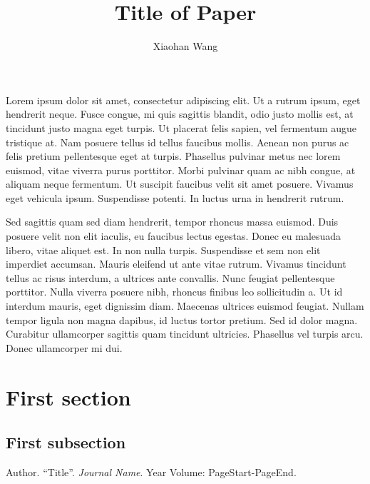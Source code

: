 \documentclass[10pt]{article}
\begin{document}
\title{Title of Paper}
\author{\small{Xiaohan Wang}}\date{}
\maketitle

Lorem ipsum dolor sit amet, consectetur adipiscing elit. Ut a rutrum ipsum, eget hendrerit neque. Fusce congue, mi quis sagittis blandit, odio justo mollis est, at tincidunt justo magna eget turpis. Ut placerat felis sapien, vel fermentum augue tristique at. Nam posuere tellus id tellus faucibus mollis. Aenean non purus ac felis pretium pellentesque eget at turpis. Phasellus pulvinar metus nec lorem euismod, vitae viverra purus porttitor. Morbi pulvinar quam ac nibh congue, at aliquam neque fermentum. Ut suscipit faucibus velit sit amet posuere. Vivamus eget vehicula ipsum. Suspendisse potenti. In luctus urna in hendrerit rutrum. \smallskip

Sed sagittis quam sed diam hendrerit, tempor rhoncus massa euismod. Duis posuere velit non elit iaculis, eu faucibus lectus egestas. Donec eu malesuada libero, vitae aliquet est. In non nulla turpis. Suspendisse et sem non elit imperdiet accumsan. Mauris eleifend ut ante vitae rutrum. Vivamus tincidunt tellus ac risus interdum, a ultrices ante convallis. Nunc feugiat pellentesque porttitor. Nulla viverra posuere nibh, rhoncus finibus leo sollicitudin a. Ut id interdum mauris, eget dignissim diam. Maecenas ultrices euismod feugiat. Nullam tempor ligula non magna dapibus, id luctus tortor pretium. Sed id dolor magna. Curabitur ullamcorper sagittis quam tincidunt ultricies. Phasellus vel turpis arcu. Donec ullamcorper mi dui.

\section{First section}

\subsection{First subsection}

{\small\begin{thebibliography}{1}    
    Author.
    ``Title''.
    \textit{Journal Name}.
    Year Volume: PageStart-PageEnd.
\end{thebibliography}}
\end{document}
